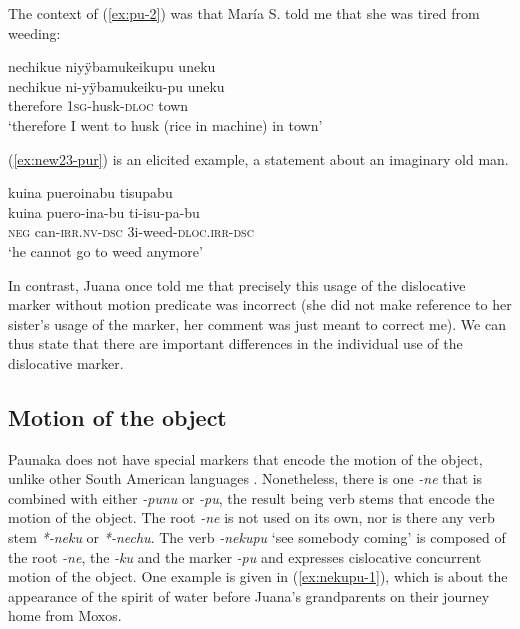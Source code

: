 The context of (\ref{ex:pu-2}) was that María S. told me that she was tired from weeding:

\ea\label{ex:pu-2}
\begingl 
\glpreamble nechikue niyÿbamukeikupu uneku\\
\gla nechikue ni-yÿbamukeiku-pu uneku\\ 
\glb therefore 1\textsc{sg}-husk-\textsc{dloc} town\\ 
\glft ‘therefore I went to husk (rice in machine) in town’
\trailingcitation{[rxx-e120511l.035]}
\xe

(\ref{ex:new23-pur}) is an elicited example, a statement about an imaginary old man.

\ea\label{ex:new23-pur}
\begingl
\glpreamble kuina pueroinabu tisupabu\\
\gla kuina puero-ina-bu ti-isu-pa-bu\\
\glb \textsc{neg} can-\textsc{irr.nv}-\textsc{dsc} 3i-weed-\textsc{dloc.irr}-\textsc{dsc}\\
\glft ‘he cannot go to weed anymore’
\endgl
\trailingcitation{[rxx-e181022le]}
\xe

In contrast, Juana once told me that precisely this usage of the dislocative marker without motion predicate was incorrect (she did not make reference to her sister’s usage of the marker, her comment was just meant to correct me). We can thus state that there are important differences in the individual use of the dislocative marker.

\subsection{Motion of the object}\label{sec:OBJ-AM}

Paunaka does not have special markers that encode the motion of the object, unlike other South American languages \citep[cf.][]{Guillaume2016}. Nonetheless, there is one  \textit{-ne} that is combined with either \textit{-punu} or \textit{-pu}, the result being verb stems that encode the motion of the object. The root \textit{-ne} is not used on its own, nor is there any verb stem \textit{*-neku} or \textit{*-nechu}. The verb \textit{-nekupu} ‘see somebody coming’ is composed of the root \textit{-ne}, the  \textit{-ku} and the  marker \textit{-pu} and expresses cislocative concurrent motion of the object. One example is given in (\ref{ex:nekupu-1}), which is about the appearance of the spirit of water before Juana’s grandparents on their journey home from Moxos.

